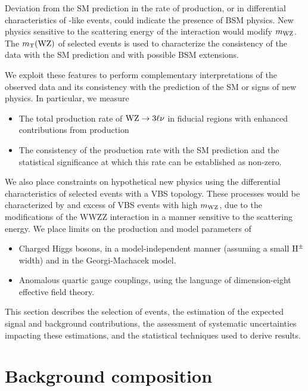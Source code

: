Deviation from the SM prediction in the rate of \EWWZ production, or in differential characteristics 
of \EWWZ-like events, could indicate the presence of BSM physics. New physics 
sensitive to the scattering energy of the interaction would modify $m_{\mathrm{W}\mathrm{Z}}$.
The $m_{\mathrm{T}}(\mathrm{W}\mathrm{Z})$ of selected events is used to characterize the consistency of
the data with the SM prediction and with possible BSM extensions.

We exploit these features to perform complementary interpretations of the
observed data and its consistency with the prediction of the SM or signs 
of new physics. In particular, we measure

\begin{itemize}
  \item The total production rate of $\mathrm{W}\mathrm{Z} \rightarrow 3\ell\nu$ in
    fiducial regions with enhanced contributions from \EWWZ production
  \item The consistency of the \EWWZ production rate
    with the SM prediction and the statistical significance at which this rate
    can be established as non-zero.
\end{itemize}

We also place constraints on hypothetical new physics using the differential
characteristics of selected \WZ events with a VBS topology. 
These processes would be characterized by and excess of VBS \WZ events
with high $m_{\mathrm{W}\mathrm{Z}}$, due to the modifications of the WWZZ interaction
in a manner sensitive to the scattering energy.
We place limits on the production and model parameters of

\begin{itemize}
  \item Charged Higgs bosons, in a model-independent manner (assuming
    a small $\mathrm{H}^{\pm}$ width) and in the Georgi-Machacek model.
  \item Anomalous quartic gauge couplings, using the language of
    dimension-eight effective field theory.
\end{itemize}

This section describes the selection of events, the estimation of 
the expected signal and background contributions, the assessment of
systematic uncertainties impacting these estimations, and the statistical
techniques used to derive results.

\section{Background composition}

